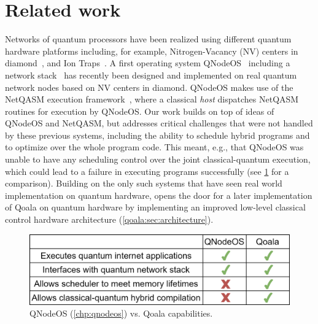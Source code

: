 \section{Related work}
\label{qoala:sec:related_work}

Networks of quantum processors have been realized using different quantum hardware platforms including, for example, Nitrogen-Vacancy (NV) centers in diamond~\cite{pompili2021realization}, and Ion Traps~\cite{krutyanskiy2023entanglement}.
A first operating system QNodeOS~\cite{carlothesis} including a network stack~\cite{pompili2022experimental} has recently been designed and implemented on real quantum network nodes based on NV centers in diamond.
QNodeOS makes use of the NetQASM execution framework~\cite{dahlberg2022netqasm}, where a classical \textit{host} dispatches NetQASM routines for execution by QNodeOS. 
Our work builds on top of ideas of QNodeOS and NetQASM, but addresses critical challenges that were not handled by these previous systems, including the ability to schedule hybrid programs and to optimize over the whole program code.
This meant, e.g., that QNodeOS was unable to have any scheduling control over the joint classical-quantum execution, which could lead to a failure in executing programs successfully (see \cref{qoala:fig:qoala_vs_qnos} for a comparison).
Building on the only such systems that have seen real world implementation on quantum hardware, opens the door for a later implementation of Qoala on quantum hardware by implementing an improved low-level classical control hardware architecture (\cref{qoala:sec:architecture}).

\begin{figure}[ht]
    \centering
    \includegraphics[width=\columnwidth]{figures/qoala/qoala_vs_qnos.png}
    \caption{
        QNodeOS (\cref{chp:qnodeos}) vs. Qoala capabilities.
    }
    \label{qoala:fig:qoala_vs_qnos}
\end{figure}


